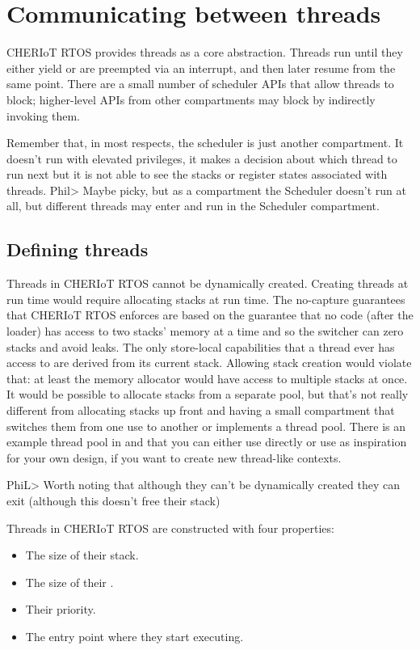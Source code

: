 \chapter[label=threads]{Communicating between threads}

CHERIoT RTOS provides threads as a core abstraction.
Threads run until they either yield or are preempted via an interrupt, and then later resume from the same point.
There are a small number of scheduler APIs that allow threads to block; higher-level APIs from other compartments may block by indirectly invoking them.

Remember that, in most respects, the scheduler is just another compartment.
It doesn't run with elevated privileges, it makes a decision about which thread to run next but it is not able to see the stacks or register states associated with threads.
Phil> Maybe picky, but as a compartment the Scheduler doesn't run at all, but different threads may enter and run in the Scheduler compartment.  

\section{Defining threads}

Threads in CHERIoT RTOS cannot be dynamically created.
Creating threads at run time would require allocating stacks at run time.
The no-capture guarantees that CHERIoT RTOS enforces are based on the guarantee that no code (after the loader) has access to two stacks' memory at a time and so the switcher can zero stacks and avoid leaks.
The only store-local capabilities that a thread ever has access to are derived from its current stack.
Allowing stack creation would violate that: at least the memory allocator would have access to multiple stacks at once.
It would be possible to allocate stacks from a separate pool, but that's not really different from allocating stacks up front and having a small compartment that switches them from one use to another or implements a thread pool.
There is an example thread pool in  and  that you can either use directly or use as inspiration for your own design, if you want to create new thread-like contexts.

PhiL> Worth noting that although they can't be dynamically created they can exit (although this doesn't free their stack) 

Threads in CHERIoT RTOS are constructed with four properties:

\begin{itemize}
	\item{The size of their stack.}
	\item{The size of their .}
	\item{Their priority.}
	\item{The entry point where they start executing.}
\end{itemize}

